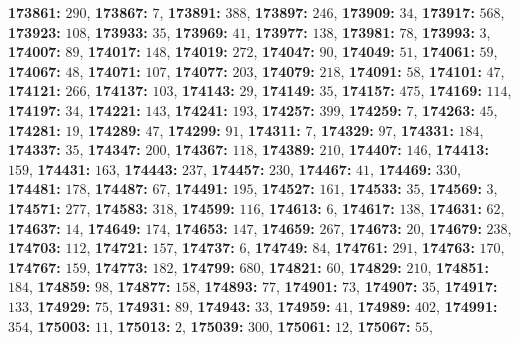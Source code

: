\textsf{\bfseries 173861:} $290$, \textsf{\bfseries 173867:} $7$, \textsf{\bfseries 173891:} $388$, \textsf{\bfseries 173897:} $246$, \textsf{\bfseries 173909:} $34$, \textsf{\bfseries 173917:} $568$, \textsf{\bfseries 173923:} $108$, \textsf{\bfseries 173933:} $35$, \textsf{\bfseries 173969:} $41$, \textsf{\bfseries 173977:} $138$, \textsf{\bfseries 173981:} $78$, \textsf{\bfseries 173993:} $3$, \textsf{\bfseries 174007:} $89$, \textsf{\bfseries 174017:} $148$, \textsf{\bfseries 174019:} $272$, \textsf{\bfseries 174047:} $90$, \textsf{\bfseries 174049:} $51$, \textsf{\bfseries 174061:} $59$, \textsf{\bfseries 174067:} $48$, \textsf{\bfseries 174071:} $107$, \textsf{\bfseries 174077:} $203$, \textsf{\bfseries 174079:} $218$, \textsf{\bfseries 174091:} $58$, \textsf{\bfseries 174101:} $47$, \textsf{\bfseries 174121:} $266$, \textsf{\bfseries 174137:} $103$, \textsf{\bfseries 174143:} $29$, \textsf{\bfseries 174149:} $35$, \textsf{\bfseries 174157:} $475$, \textsf{\bfseries 174169:} $114$, \textsf{\bfseries 174197:} $34$, \textsf{\bfseries 174221:} $143$, \textsf{\bfseries 174241:} $193$, \textsf{\bfseries 174257:} $399$, \textsf{\bfseries 174259:} $7$, \textsf{\bfseries 174263:} $45$, \textsf{\bfseries 174281:} $19$, \textsf{\bfseries 174289:} $47$, \textsf{\bfseries 174299:} $91$, \textsf{\bfseries 174311:} $7$, \textsf{\bfseries 174329:} $97$, \textsf{\bfseries 174331:} $184$, \textsf{\bfseries 174337:} $35$, \textsf{\bfseries 174347:} $200$, \textsf{\bfseries 174367:} $118$, \textsf{\bfseries 174389:} $210$, \textsf{\bfseries 174407:} $146$, \textsf{\bfseries 174413:} $159$, \textsf{\bfseries 174431:} $163$, \textsf{\bfseries 174443:} $237$, \textsf{\bfseries 174457:} $230$, \textsf{\bfseries 174467:} $41$, \textsf{\bfseries 174469:} $330$, \textsf{\bfseries 174481:} $178$, \textsf{\bfseries 174487:} $67$, \textsf{\bfseries 174491:} $195$, \textsf{\bfseries 174527:} $161$, \textsf{\bfseries 174533:} $35$, \textsf{\bfseries 174569:} $3$, \textsf{\bfseries 174571:} $277$, \textsf{\bfseries 174583:} $318$, \textsf{\bfseries 174599:} $116$, \textsf{\bfseries 174613:} $6$, \textsf{\bfseries 174617:} $138$, \textsf{\bfseries 174631:} $62$, \textsf{\bfseries 174637:} $14$, \textsf{\bfseries 174649:} $174$, \textsf{\bfseries 174653:} $147$, \textsf{\bfseries 174659:} $267$, \textsf{\bfseries 174673:} $20$, \textsf{\bfseries 174679:} $238$, \textsf{\bfseries 174703:} $112$, \textsf{\bfseries 174721:} $157$, \textsf{\bfseries 174737:} $6$, \textsf{\bfseries 174749:} $84$, \textsf{\bfseries 174761:} $291$, \textsf{\bfseries 174763:} $170$, \textsf{\bfseries 174767:} $159$, \textsf{\bfseries 174773:} $182$, \textsf{\bfseries 174799:} $680$, \textsf{\bfseries 174821:} $60$, \textsf{\bfseries 174829:} $210$, \textsf{\bfseries 174851:} $184$, \textsf{\bfseries 174859:} $98$, \textsf{\bfseries 174877:} $158$, \textsf{\bfseries 174893:} $77$, \textsf{\bfseries 174901:} $73$, \textsf{\bfseries 174907:} $35$, \textsf{\bfseries 174917:} $133$, \textsf{\bfseries 174929:} $75$, \textsf{\bfseries 174931:} $89$, \textsf{\bfseries 174943:} $33$, \textsf{\bfseries 174959:} $41$, \textsf{\bfseries 174989:} $402$, \textsf{\bfseries 174991:} $354$, \textsf{\bfseries 175003:} $11$, \textsf{\bfseries 175013:} $2$, \textsf{\bfseries 175039:} $300$, \textsf{\bfseries 175061:} $12$, \textsf{\bfseries 175067:} $55$, 
